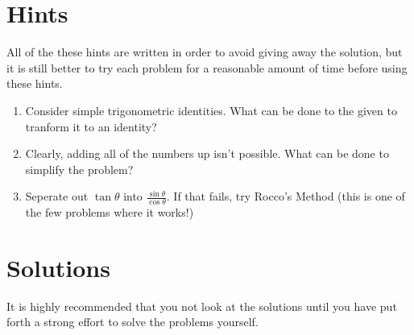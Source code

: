 \documentclass[12pt, letterpaper]{article}
\begin{document}
\newpage

\section{Hints}

All of the these hints are written in order to avoid giving away the solution, but it is still better to try each problem for a reasonable amount of time before using these hints.

\begin{enumerate}

\item Consider simple trigonometric identities.  What can be done to the given to tranform it to an identity?

\item Clearly, adding all of the numbers up isn't possible.  What can be done to simplify the problem?

\item Seperate out $\tan{\theta}$ into $\frac{\sin{\theta}}{\cos{\theta}}$.  If that fails, try Rocco's Method (this is one of the few problems where it works!)

\end{enumerate}

\newpage

\section{Solutions}

It is highly recommended that you not look at the solutions until you have put forth a strong effort to solve the problems yourself.  
\end{document}
